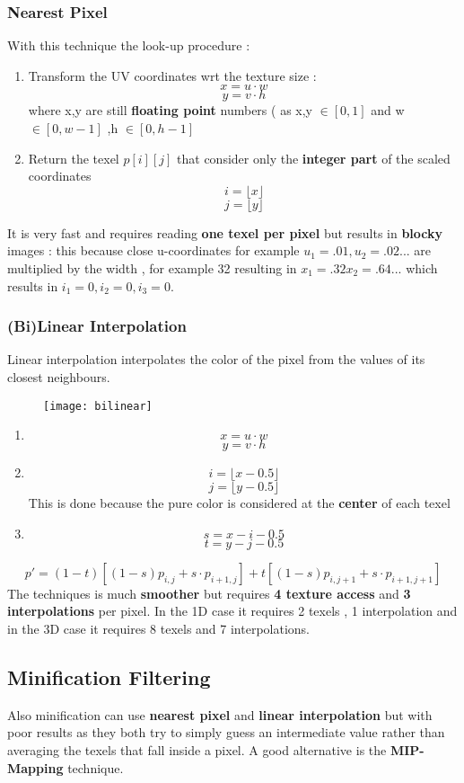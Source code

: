 \subsubsection{Nearest Pixel}
With this technique the look-up procedure :
\begin{enumerate}
\item Transform the UV coordinates wrt the texture size : $$ x= u \cdot w $$ $$y = v \cdot h $$ where x,y are still \textbf{floating point} numbers ( as x,y $ \in [0,1]$ and w $\in [0,w-1]$ ,h $\in [0,h-1]$
\item Return the texel $p[i][j]$ that consider only the \textbf{integer part} of the scaled coordinates
$$ i = \lfloor x \rfloor $$
$$ j = \lfloor y \rfloor $$ 
\end{enumerate}
It is very fast and requires reading \textbf{one texel per pixel} but results in \textbf{blocky} images : this because close u-coordinates for example $ u_1 = .01 ,u_2 = .02 ...$ are multiplied by the width , for example 32 resulting in $x_1= .32 x_2 = .64 ...$ which results in $i_1= 0 ,i_2 = 0 ,i_3=0$.

\subsubsection{(Bi)Linear Interpolation}
Linear interpolation interpolates the color of the pixel from the values of its closest neighbours.
\begin{figure}[H]
 \centering
 \texttt{[image: bilinear]} 
 \end{figure}

\begin{enumerate}
\item  $$ x= u \cdot w$$ $$ y= v \cdot h$$
\item $$ i = \lfloor x - 0.5 \rfloor $$
$$ j = \lfloor y -0.5 \rfloor $$ 
This is done because the pure color is considered at the \textbf{center } of each texel
\item $$ s=x-i-0.5$$ $$ t = y-j-0.5$$
\end{enumerate}
\[
\boxed{p' = (1-t)[(1-s)p_{i,j} + s \cdot p_{i+1,j}]+t[(1-s)p_{i,j+1}+ s \cdot p_{i+1,j+1}]}
\]
The techniques is much \textbf{smoother} but requires \textbf{4 texture access} and \textbf{3 interpolations} per pixel. In the 1D case it requires 2 texels , 1 interpolation and in the 3D case it requires 8 texels and 7 interpolations.

\subsection{Minification Filtering}
Also minification can use \textbf{nearest pixel} and \textbf{linear interpolation} but with poor results as they both try to simply guess an intermediate value rather than averaging the texels that fall inside a pixel.
A good alternative is the \textbf{MIP-Mapping} technique.

